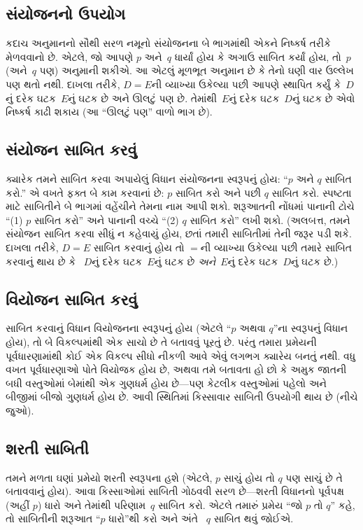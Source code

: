 \subsection{સંયોજનનો ઉપયોગ}

કદાચ અનુમાનનો સૌથી સરળ નમૂનો સંયોજનના બે ભાગમાંથી એકને
નિષ્કર્ષ તરીકે મેળવવાનો છે. એટલે, જો આપણે $p$ અને~$q$ ધાર્યાં
હોય કે અગાઉ સાબિત કર્યાં હોય, તો~$p$ (અને~$q$ પણ) અનુમાની
શકીએ. આ એટલું મૂળભૂત અનુમાન છે કે તેનો ઘણી વાર ઉલ્લેખ પણ
થતો નથી. દાખલા તરીકે, $D = E$ની વ્યાખ્યા ઉકેલ્યા પછી આપણે
સ્થાપિત કર્યું કે~$D$નું દરેક ઘટક~$E$નું ઘટક
છે અને ઊલટું પણ છે. તેમાંથી~$E$નું દરેક ઘટક~$D$નું
ઘટક છે એવો નિષ્કર્ષ કાઢી શકાય (આ ``ઊલટું પણ'' વાળો ભાગ છે).

\subsection{સંયોજન સાબિત કરવું}

ક્યારેક તમને સાબિત કરવા અપાયેલું વિધાન સંયોજનના સ્વરૂપનું હોય:
``$p$ અને $q$ સાબિત કરો.'' એ વખતે ફક્ત બે કામ કરવાનાં છે:
$p$ સાબિત કરો અને પછી $q$ સાબિત કરો. સ્પષ્ટતા માટે સાબિતીને
બે ભાગમાં વહેંચીને તેમના નામ આપી શકો. શરૂઆતની નોંધમાં
પાનાની ટોચે ``(1) $p$ સાબિત કરો'' અને પાનાની વચ્ચે
``(2) $q$ સાબિત કરો'' લખી શકો. (અલબત્ત, તમને સંયોજન
સાબિત કરવા સીધું ન કહેવાયું હોય, છતાં તમારી સાબિતીમાં તેની
જરૂર પડી શકે. દાખલા તરીકે, $D = E$ સાબિત કરવાનું હોય તો
$=$ની વ્યાખ્યા ઉકેલ્યા પછી તમારે સાબિત કરવાનું થાય છે કે
~$D$નું દરેક ઘટક~$E$નું ઘટક છે
\emph{અને}~$E$નું દરેક ઘટક~$D$નું ઘટક છે.)

\subsection{વિયોજન સાબિત કરવું}

સાબિત કરવાનું વિધાન વિયોજનના સ્વરૂપનું હોય (એટલે ``$p$ અથવા
$q$''ના સ્વરૂપનું વિધાન હોય), તો બે વિકલ્પમાંથી એક સાચો છે તે
બતાવવું પૂરતું છે. પરંતુ તમારા પ્રમેયની પૂર્વધારણામાંથી કોઈ એક
વિકલ્પ સીધો નીકળી આવે એવું લગભગ ક્યારેય બનતું નથી. વધુ વખત
પૂર્વધારણાઓ પોતે વિયોજક હોય છે, અથવા તમે બતાવતા હો છો કે અમુક
જાતની બધી વસ્તુઓમાં બેમાંથી એક ગુણધર્મ હોય છે---પણ કેટલીક
વસ્તુઓમાં પહેલો અને બીજીમાં બીજો ગુણધર્મ હોય છે. આવી સ્થિતિમાં
કિસ્સાવાર સાબિતી ઉપયોગી થાય છે (નીચે જુઓ).

\subsection{શરતી સાબિતી}

તમને મળતા ઘણાં પ્રમેયો શરતી સ્વરૂપના હશે (એટલે, $p$ સાચું હોય
તો $q$ પણ સાચું છે તે બતાવવાનું હોય). આવા કિસ્સાઓમાં સાબિતી
ગોઠવવી સરળ છે---શરતી વિધાનનો પૂર્વપક્ષ (અહીં $p$) ધારો અને
તેમાંથી પરિણામ~$q$ સાબિત કરો. એટલે તમારું પ્રમેય ``જો $p$ તો
$q$'' કહે, તો સાબિતીની શરૂઆત ``$p$ ધારો''થી કરો અને અંતે
~$q$ સાબિત થવું જોઈએ.

